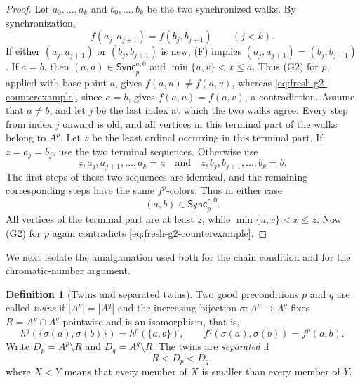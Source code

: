 \documentclass{amsart}
\numberwithin{equation}{section}
\theoremstyle{definition}
\newtheorem{definition}[theorem]{Definition}
\theoremstyle{remark}
\begin{document}
\begin{proof}
Let $a_0,\ldots,a_k$ and $b_0,\ldots,b_k$ be the two synchronized
walks.  By synchronization,
\begin{displaymath}
 f(a_j,a_{j+1})=f(b_j,b_{j+1})\qquad(j<k).
\end{displaymath}
If either $(a_j,a_{j+1})$ or $(b_j,b_{j+1})$ is new, (F) implies
$(a_j,a_{j+1})=(b_j,b_{j+1})$.  If $a=b$, then
$(a,a)\in\mathsf{Sync}^{a,0}_p$ and
$\min\{u,v\}<x\leq a$.  Thus (G2) for $p$, applied with base point
$a$, gives $f(a,u)\ne f(a,v)$, whereas
\eqref{eq:fresh-g2-counterexample}, since $a=b$, gives
$f(a,u)=f(a,v)$, a contradiction.
Assume that $a\ne b$, and let $j$ be the last index at which the two
walks agree.  Every step from index $j$ onward is old, and all vertices
in this terminal part of the walks belong to $A^p$.  Let $z$ be the
least ordinal occurring in this terminal part.  If $z=a_j=b_j$, use
the two terminal sequences.  Otherwise use
\begin{displaymath}
 z,a_j,a_{j+1},\ldots,a_k=a
 \quad\text{and}\quad
 z,b_j,b_{j+1},\ldots,b_k=b.
\end{displaymath}
The first steps of these two sequences are identical, and the remaining
corresponding steps have the same $f^p$-colors.  Thus in either case
\begin{displaymath}
 (a,b)\in\mathsf{Sync}^{z,0}_p.
\end{displaymath}
All vertices of the terminal part are at least $z$, while
$\min\{u,v\}<x\leq z$.  Now (G2) for $p$ again contradicts
\eqref{eq:fresh-g2-counterexample}.
\end{proof}

We next isolate the amalgamation used both for the chain condition and
for the chromatic-number argument.

\begin{definition}[Twins and separated twins]\label{def:twins}
Two good preconditions $p$ and $q$
are called \emph{twins} if $|A^p|=|A^q|$ and the increasing bijection
$\sigma:A^p\to A^q$ fixes $R=A^p\cap A^q$ pointwise and is an
isomorphism, that is,
\begin{displaymath}
 h^q(\{\sigma(a),\sigma(b)\})=h^p(\{a,b\}),
 \qquad
 f^q(\sigma(a),\sigma(b))=f^p(a,b).
\end{displaymath}
Write $D_p=A^p\setminus R$ and $D_q=A^q\setminus R$.
The twins are \emph{separated} if
\begin{displaymath}
 R<D_p<D_q,
\end{displaymath}
where $X<Y$ means that every member of $X$ is smaller than every
member of $Y$.
\end{definition}
\end{document}
